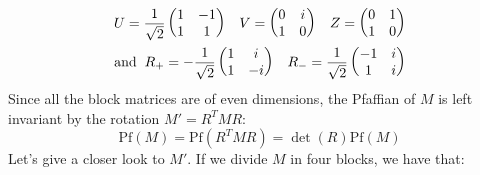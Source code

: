 \begin{equation}
\begin{split}
    U = \frac{1}{\sqrt{2}} \begin{pmatrix}
        1 & -1 \\
        1 & 1 \\
    \end{pmatrix} \hspace{3mm} V = \begin{pmatrix}
        0 & i \\
        1 & 0 \\
    \end{pmatrix} \hspace{3mm} Z = \begin{pmatrix}
        0 & 1 \\
        1 & 0 \\
    \end{pmatrix} \\ \mbox{and} \hspace{2mm} R_+ = - \frac{1}{\sqrt{2}} \begin{pmatrix}
        1 & i \\
        1 & -i \\
    \end{pmatrix} \hspace{3mm} R_- = \frac{1}{\sqrt{2}}\begin{pmatrix}
        -1 & i \\
        1 & i \\
    \end{pmatrix}
\end{split}
\end{equation}
Since all the block matrices are of even dimensions, the Pfaffian of $M$ is left invariant by the rotation $M' = R^T M R$:
\begin{equation}
    \textrm{Pf}(M) = \textrm{Pf}(R^{T} M R) = \det(R) \textrm{Pf}(M)
\end{equation}
Let's give a closer look to $M'$. If we divide $M$ in four blocks, we have that:
